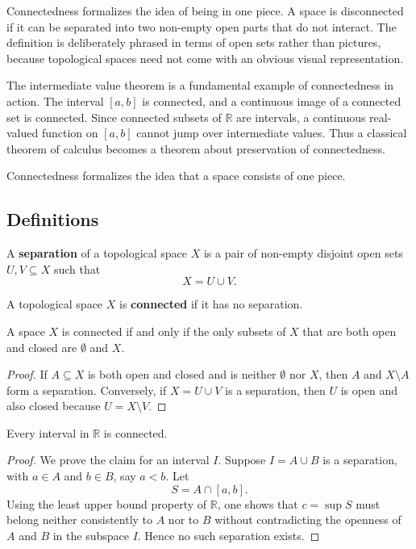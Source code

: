 Connectedness formalizes the idea of being in one piece. A space is disconnected if it can be separated into two non-empty open parts that do not interact. The definition is deliberately phrased in terms of open sets rather than pictures, because topological spaces need not come with an obvious visual representation.

The intermediate value theorem is a fundamental example of connectedness in action. The interval $[a,b]$ is connected, and a continuous image of a connected set is connected. Since connected subsets of $\mathbb{R}$ are intervals, a continuous real-valued function on $[a,b]$ cannot jump over intermediate values. Thus a classical theorem of calculus becomes a theorem about preservation of connectedness.

Connectedness formalizes the idea that a space consists of one piece.

\subsection{Definitions}

\begin{definition}[Separation]
A \textbf{separation} of a topological space $X$ is a pair of non-empty disjoint open sets $U,V\subseteq X$ such that
\[
    X=U\cup V.
\]
\end{definition}

\begin{definition}
A topological space $X$ is \textbf{connected} if it has no separation.
\end{definition}

\begin{proposition}
A space $X$ is connected if and only if the only subsets of $X$ that are both open and closed are $\emptyset$ and $X$.
\end{proposition}

\begin{proof}
If $A\subseteq X$ is both open and closed and is neither $\emptyset$ nor $X$, then $A$ and $X\setminus A$ form a separation. Conversely, if $X=U\cup V$ is a separation, then $U$ is open and also closed because $U=X\setminus V$.
\end{proof}

\begin{theorem}
Every interval in $\mathbb{R}$ is connected.
\end{theorem}

\begin{proof}
We prove the claim for an interval $I$. Suppose $I=A\cup B$ is a separation, with $a\in A$ and $b\in B$, say $a<b$. Let
\[
    S=A\cap [a,b].
\]
Using the least upper bound property of $\mathbb{R}$, one shows that $c=\sup S$ must belong neither consistently to $A$ nor to $B$ without contradicting the openness of $A$ and $B$ in the subspace $I$. Hence no such separation exists.
\end{proof}

